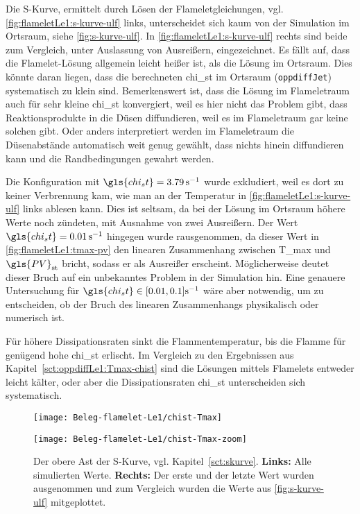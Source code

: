 Die S-Kurve, ermittelt durch Lösen der Flameletgleichungen, vgl. \autoref{fig:flameletLe1:s-kurve-ulf} links, unterscheidet sich kaum von der Simulation im Ortsraum, siehe \autoref{fig:s-kurve-ulf}. In \autoref{fig:flameletLe1:s-kurve-ulf} rechts sind beide zum Vergleich, unter Auslassung von Ausreißern, eingezeichnet. Es fällt auf, dass die Flamelet-Lösung allgemein leicht heißer ist, als die Lösung im Ortsraum. Dies könnte daran liegen, dass die berechneten \gls{chi_st} im Ortsraum (\lstinline!oppdiffJet!) systematisch zu klein sind. Bemerkenswert ist, dass die Lösung im Flameletraum auch für sehr kleine \gls{chi_st} konvergiert, weil es hier nicht das Problem gibt, dass Reaktionsprodukte in die Düsen diffundieren, weil es im Flameletraum gar keine solchen gibt. Oder anders interpretiert werden im Flameletraum die Düsenabstände automatisch weit genug gewählt, dass nichts hinein diffundieren kann und die Randbedingungen gewahrt werden.

Die Konfiguration mit $\gls{chi_st}=\SI{3.79}{\per\second}$ wurde exkludiert, weil es dort zu keiner Verbrennung kam, wie man an der Temperatur in \autoref{fig:flameletLe1:s-kurve-ulf} links ablesen kann. Dies ist seltsam, da bei der Lösung im Ortsraum höhere Werte noch zündeten, mit Ausnahme von zwei Ausreißern.
Der Wert $\gls{chi_st}=\SI{0.01}{\per\second}$ hingegen wurde rausgenommen, da dieser Wert in \autoref{fig:flameletLe1:tmax-pv} den linearen Zusammenhang zwischen \gls{T_max} und $\gls{PV}_\mathrm{st}$ bricht, sodass er als Ausreißer erscheint. Möglicherweise deutet dieser Bruch auf ein unbekanntes Problem in der Simulation hin. Eine genauere Untersuchung für $\gls{chi_st} \in [0.01,0.1]\SI{}{\per\second}$ wäre aber notwendig, um zu entscheiden, ob der Bruch des linearen Zusammenhangs physikalisch oder numerisch ist.

Für höhere Dissipationsraten sinkt die Flammentemperatur, bis die Flamme für genügend hohe \gls{chi_st} erlischt. Im Vergleich zu den Ergebnissen aus Kapitel~\ref{sct:oppdiffLe1:Tmax-chist} sind die Lösungen mittels Flamelets entweder leicht kälter, oder aber die Dissipationsraten \gls{chi_st} unterscheiden sich systematisch.

\begin{figure}[H]
    \begin{center}\begin{minipage}{0.49\linewidth}
        \texttt{[image: Beleg-flamelet-Le1/chist-Tmax]}
    \end{minipage}\begin{minipage}{0.49\linewidth}
        \texttt{[image: Beleg-flamelet-Le1/chist-Tmax-zoom]}
    \end{minipage}\end{center}
    \caption{Der obere Ast der S-Kurve, vgl. Kapitel~\ref{sct:skurve}. \textbf{Links:} Alle simulierten Werte. \textbf{Rechts:} Der erste und der letzte Wert wurden ausgenommen und zum Vergleich wurden die Werte aus \autoref{fig:s-kurve-ulf} mitgeplottet.}
    \label{fig:flameletLe1:s-kurve-ulf}
\end{figure}


